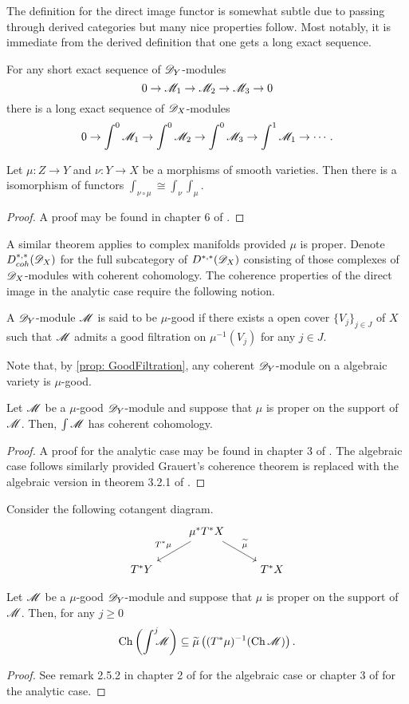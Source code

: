 The definition for the direct image functor is somewhat subtle due to passing through derived categories but many nice properties follow.
Most notably, it is immediate from the derived definition that one gets a long exact sequence.
\begin{proposition}
    For any short exact sequence of $\mathscr{D}_Y$-modules
    $$0 \to \mathscr{M}_1 \to \mathscr{M}_2 \to \mathscr{M}_3 \to 0 $$
    there is a long exact sequence of $\mathscr{D}_X$-modules
    $$0 \to \int^0\mathscr{M}_1 \to \int^0 \mathscr{M}_2 \to \int^0 \mathscr{M}_3 \to \int^1 \mathscr{M}_1 \to \cdots.$$
\end{proposition}
\begin{proposition}
  Let $\mu:Z\to Y$ and $\nu:Y\to X$ be a morphisms of smooth varieties. Then there is a isomorphism of functors $\int_{\nu\circ \mu} \cong \int_\nu \int_\mu$.
\end{proposition}
\begin{proof}
  A proof may be found in chapter 6 of \cite{borel1987algebraic}.
\end{proof}
A similar theorem applies to complex manifolds provided $\mu$ is proper.
Denote $D_{coh}^{*,*}(\mathscr{D}_X)$ for the full subcategory of $D^{*,*}(\mathscr{D}_X)$ consisting of those complexes of $\mathscr{D}_X$-modules with coherent cohomology.
The coherence properties of the direct image in the analytic case require the following notion.
\begin{definition}
  A $\mathscr{D}_Y$-module $\mathscr{M}$ is said to be $\mu$-good if there exists a open cover $\{V_j\}_{j\in J}$ of $X$ such that $\mathscr{M}$ admits a good filtration on $\mu^{-1}(V_j)$ for any $j\in J$.
\end{definition}
Note that, by \cref{prop: GoodFiltration}, any coherent $\mathscr{D}_Y$-module on a algebraic variety is $\mu$-good.
\begin{theorem}\label{thm: MuGoodCoherent}
  Let $\mathscr{M}$ be a $\mu$-good $\mathscr{D}_Y$-module and suppose that $\mu$ is proper on the support of $\mathscr{M}$.
  Then, $\int \mathscr{M}$ has coherent cohomology.
\end{theorem}
\begin{proof}
  A proof for the analytic case may be found in chapter 3 of \cite{sabbah2011introduction}. The algebraic case follows similarly provided Grauert's coherence theorem is replaced with the algebraic version in theorem 3.2.1 of \cite{EGAIII}.
\end{proof}
Consider the following cotangent diagram.
$$
\begin{tikzcd}
    & \mu^* T^* X\arrow[swap]{ld}{T^* \mu} \arrow{rd}{\widetilde{\mu}} & \\
    T^* Y & & T^*X
\end{tikzcd}
$$
\begin{proposition}\label{prop: EstimateProper}
  Let $\mathscr{M}$ be a $\mu$-good $\mathscr{D}_Y$-module and suppose that $\mu$ is proper on the support of $\mathscr{M}$. Then, for any $j\geq 0$
  $$\operatorname{Ch}\left(\int^j \mkern -8mu \mathscr{M} \right)\subseteq  \widetilde{\mu}\left((T^*\mu)^{-1}(\operatorname{Ch} \mathscr{M}) \right).$$
\end{proposition}
\begin{proof}
  See remark 2.5.2 in chapter 2 of \cite{hotta2007d} for the algebraic case or chapter 3 of \cite{sabbah2011introduction} for the analytic case.
\end{proof}
